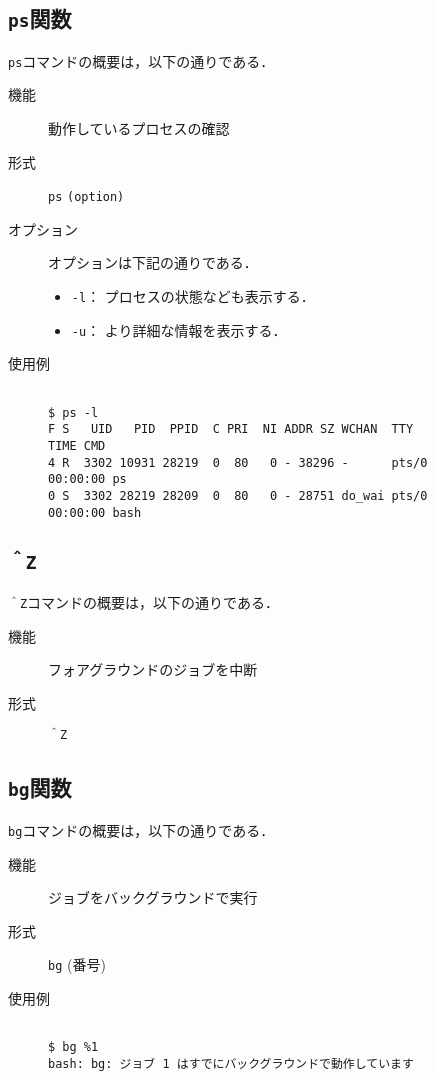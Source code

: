 \documentclass[a4j,11pt]{jarticle}
\begin{document}
\subsection{\texttt{ps}関数}

\verb|ps|コマンドの概要は，以下の通りである．
\begin{description}
  \item[機能]
    動作しているプロセスの確認
  \item[形式]
    \verb|ps| \verb|(option)|
  \item[オプション]
    オプションは下記の通りである．
    \begin{itemize}
      \item \verb|-l|：  プロセスの状態なども表示する．
      \item \verb|-u|：  より詳細な情報を表示する．
    \end{itemize}
  \item[使用例]
    \begin{verbatim}

$ ps -l
F S   UID   PID  PPID  C PRI  NI ADDR SZ WCHAN  TTY          TIME CMD
4 R  3302 10931 28219  0  80   0 - 38296 -      pts/0    00:00:00 ps
0 S  3302 28219 28209  0  80   0 - 28751 do_wai pts/0    00:00:00 bash

    \end{verbatim}
\end{description}

\subsection{\texttt{＾Z}}

\verb|＾Z|コマンドの概要は，以下の通りである．
\begin{description}
  \item[機能]
    フォアグラウンドのジョブを中断
  \item[形式]
    \verb|＾Z| 

\end{description}

\subsection{\texttt{bg}関数}

\verb|bg|コマンドの概要は，以下の通りである．
\begin{description}
  \item[機能]
    ジョブをバックグラウンドで実行
  \item[形式]
    \verb|bg| (番号)
  \item[使用例]
    \begin{verbatim}

$ bg %1
bash: bg: ジョブ 1 はすでにバックグラウンドで動作しています

    \end{verbatim}
\end{description}
\end{document}
